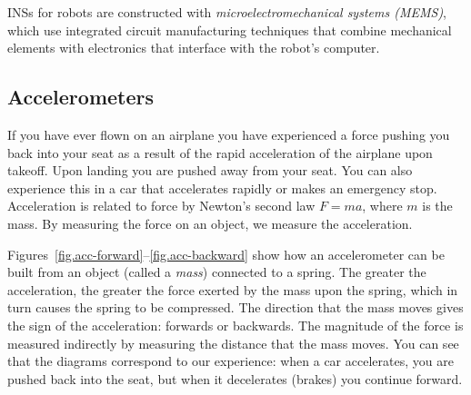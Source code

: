 INSs for robots are constructed with \emph{microelectromechanical systems (MEMS)}, which use integrated circuit manufacturing techniques that combine mechanical elements with electronics that interface with the robot's computer.

\subsection{Accelerometers}\label{s.accelerometer}

If you have ever flown on an airplane you have experienced a force pushing you back into your seat as a result of the rapid acceleration of the airplane upon takeoff. Upon landing you are pushed away from your seat. You can also experience this in a car that accelerates rapidly or makes an emergency stop. Acceleration is related to force by Newton's second law $F=ma$, where $m$ is the mass. By measuring the force on an object, we measure the acceleration.

Figures~\ref{fig.acc-forward}--\ref{fig.acc-backward} show how an accelerometer can be built from an object (called a \emph{mass}) connected to a spring. The greater the acceleration, the greater the force exerted by the mass upon the spring, which in turn causes the spring to be compressed. The direction that the mass moves gives the sign of the acceleration: forwards or backwards. The magnitude of the force is measured indirectly by measuring the distance that the mass moves. You can see that the diagrams correspond to our experience: when a car accelerates, you are pushed back into the seat, but when it decelerates (brakes) you continue forward.

